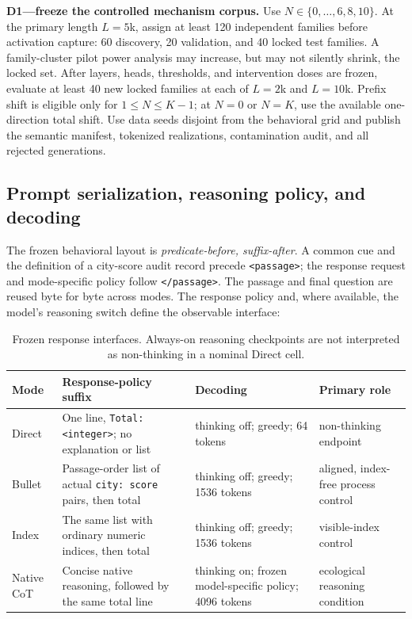 \begin{todobox}
\textbf{D1---freeze the controlled mechanism corpus.}
Use \(N\in\{0,\ldots,6,8,10\}\). At the primary length \(L=5\)k, assign at
least 120 independent families before activation capture: 60 discovery, 20
validation, and 40 locked test families. A family-cluster pilot power analysis
may increase, but may not silently shrink, the locked set. After layers,
heads, thresholds, and intervention doses are frozen, evaluate at least 40 new
locked families at each of \(L=2\)k and \(L=10\)k. Prefix shift is eligible
only for \(1\leq N\leq K-1\); at \(N=0\) or \(N=K\), use the available
one-direction total shift. Use data seeds disjoint from the behavioral grid
and publish the semantic manifest, tokenized realizations, contamination
audit, and all rejected generations.
\end{todobox}

\subsection{Prompt serialization, reasoning policy, and decoding}

The frozen behavioral layout is \emph{predicate-before, suffix-after}. A common
cue and the definition of a city-score audit record precede
\texttt{<passage>}; the response request and mode-specific policy follow
\texttt{</passage>}. The passage and final question are reused byte for byte
across modes. The response policy and, where available, the model's reasoning
switch define the observable interface:

\begin{table}[H]
\centering
\small
\caption{Frozen response interfaces. Always-on reasoning checkpoints are not
interpreted as non-thinking in a nominal Direct cell.}
\label{tab:prompt-modes}
\begin{tabularx}{\textwidth}{@{}P{.14\textwidth}P{.41\textwidth}P{.19\textwidth}Y@{}}
\toprule
Mode & Response-policy suffix & Decoding & Primary role \\
\midrule
Direct
  & One line, \texttt{Total: <integer>}; no explanation or list
  & thinking off; greedy; 64 tokens
  & non-thinking endpoint \\
Bullet
  & Passage-order list of actual \texttt{city: score} pairs, then total
  & thinking off; greedy; 1536 tokens
  & aligned, index-free process control \\
Index
  & The same list with ordinary numeric indices, then total
  & thinking off; greedy; 1536 tokens
  & visible-index control \\
Native CoT
  & Concise native reasoning, followed by the same total line
  & thinking on; frozen model-specific policy; 4096 tokens
  & ecological reasoning condition \\
\bottomrule
\end{tabularx}
\end{table}

